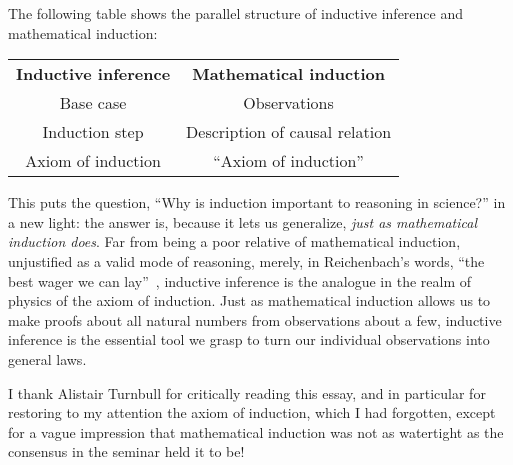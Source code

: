 \documentclass[english]{scrartcl}
\begin{document}
The following table shows the parallel structure of inductive inference and mathematical induction:

\begin{center}
  \begin{tabular}{cc}
    \textbf{Inductive inference} & \textbf{Mathematical induction}\\
    Base case & Observations\\
    Induction step & Description of causal relation\\
    Axiom of induction & “Axiom of induction”\\
  \end{tabular}
\end{center}

This puts the question, “Why is induction important to reasoning in science?” in a new light: the answer is, because it lets us generalize, \emph{just as mathematical induction does}. Far from being a poor relative of mathematical induction, unjustified as a valid mode of reasoning, merely, in Reichenbach’s words, “the best wager we can lay”~\cite{reichenbach1938eap}, inductive inference is the analogue in the realm of physics of the axiom of induction. Just as mathematical induction allows us to make proofs about all natural numbers from observations about a few, inductive inference is the essential tool we grasp to turn our individual observations into general laws.





I thank Alistair Turnbull for critically reading this essay, and in particular for restoring to my attention the axiom of induction, which I had forgotten, except for a vague impression that mathematical induction was not as watertight as the consensus in the seminar held it to be!
\end{document}
